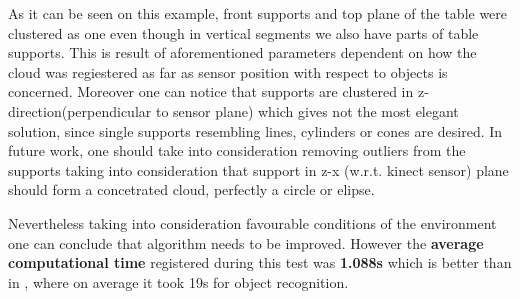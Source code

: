 \documentclass[fontsize=12pt]{article}
\begin{document}
As it can be seen on this example, front supports and top plane of the table were clustered as one even though in vertical segments we also have parts of table supports. This is result of aforementioned parameters dependent on how the cloud was regiestered as far as sensor position with respect to objects is concerned. Moreover one can notice that supports are clustered in z-direction(perpendicular to sensor plane) which gives not the most elegant solution, since single supports  resembling lines, cylinders or cones are desired. In future work, one should take into consideration removing outliers from the supports taking into consideration that support in z-x (w.r.t. kinect sensor) plane should form a concetrated cloud, perfectly a circle or elipse. 

 Nevertheless taking into consideration favourable conditions of the environment one can conclude that algorithm needs to be improved. However the \textbf{average computational time} registered during this test was \textbf{1.088s} which is better than in \cite{pap1}, where on average it took 19s for object recognition.
\end{document}
